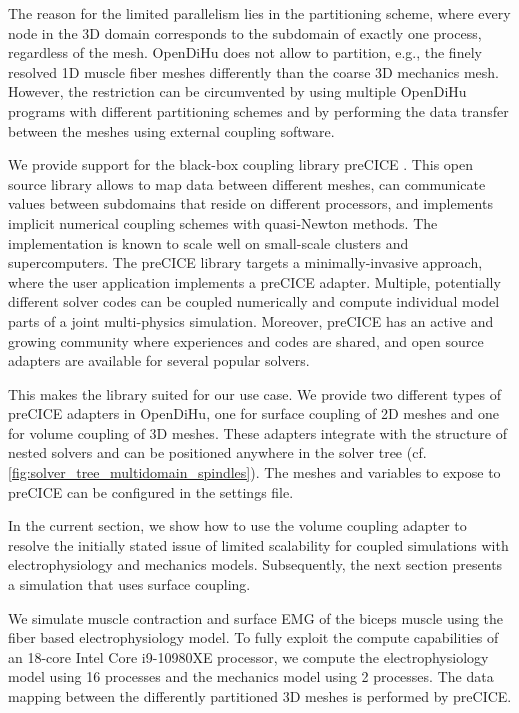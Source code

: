 The reason for the limited parallelism lies in the partitioning scheme, where every node in the 3D domain corresponds to the subdomain of exactly one process, regardless of the mesh. OpenDiHu does not allow to partition, e.g., the finely resolved 1D muscle fiber meshes differently than the coarse 3D mechanics mesh. However, the restriction can be circumvented by using multiple OpenDiHu programs with different partitioning schemes and by performing the data transfer between the meshes using external coupling software.

We provide support for the black-box coupling library preCICE \cite{precice}. This open source library allows to map data between different meshes, can communicate values between subdomains that reside on different processors, and implements implicit numerical coupling schemes with quasi-Newton methods. The implementation is known to scale well on small-scale clusters and supercomputers.
The preCICE library targets a minimally-invasive approach, where the user application implements a preCICE adapter. Multiple, potentially different solver codes can be coupled numerically and compute individual model parts of a joint multi-physics simulation. Moreover, preCICE has an active and growing community where experiences and codes are shared, and open source adapters are available for several popular solvers.

This makes the library suited for our use case. We provide two different types of preCICE adapters in OpenDiHu, one for surface coupling of 2D meshes and one for volume coupling of 3D meshes. These adapters integrate with the structure of nested solvers and can be positioned anywhere in the solver tree (cf. \cref{fig:solver_tree_multidomain_spindles}). The meshes and variables to expose to preCICE can be configured in the settings file.

In the current section, we show how to use the volume coupling adapter to resolve the initially stated issue of limited scalability for coupled simulations with electrophysiology and mechanics models. Subsequently, the next section presents a simulation that uses surface coupling.

We simulate muscle contraction and surface EMG of the biceps muscle using the fiber based electrophysiology model. To fully exploit the compute capabilities of an 18-core Intel Core i9-10980XE processor, we compute the electrophysiology model using 16 processes and the mechanics model using 2 processes. The data mapping between the differently partitioned 3D meshes is performed by preCICE.

